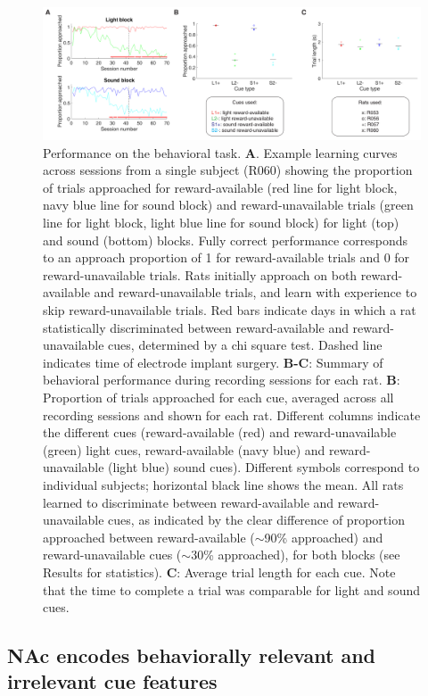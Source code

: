 \documentclass[11pt]{article}
\newcommand{\bsf}[1]{\textbf{#1}}
\begin{document}
 \begin{figure}[ht!]
\centering
\includegraphics[width=\textwidth]{Fig 3 - Behavioral results.pdf}
\caption{Performance on the behavioral task. \bsf{A}. Example learning
  curves across sessions from a single subject (R060) showing the
  proportion of trials approached for reward-available (red line for light
  block, navy blue line for sound block) and reward-unavailable trials
  (green line for light block, light blue line for sound block) for
  light (top) and sound (bottom) blocks. Fully correct performance
  corresponds to an approach proportion of 1 for reward-available
  trials and 0 for reward-unavailable trials. Rats initially approach
  on both reward-available and reward-unavailable trials, and learn
  with experience to skip reward-unavailable trials. Red bars indicate days
  in which a rat statistically discriminated between reward-available
  and reward-unavailable cues, determined by a chi square test. Dashed
  line indicates time of electrode implant surgery. \bsf{B-C}: Summary
  of behavioral performance during recording sessions for each rat. \bsf{B}:
  Proportion of trials approached for each cue, averaged across all recording
  sessions and shown for each rat. Different columns indicate the different cues
  (reward-available (red) and reward-unavailable (green) light cues,
  reward-available (navy blue) and reward-unavailable (light blue)
  sound cues). Different symbols correspond to individual subjects;
  horizontal black line shows the mean. All rats learned to
  discriminate between reward-available and reward-unavailable cues,
  as indicated by the clear difference of proportion approached
  between reward-available ($\sim$90\% approached) and
  reward-unavailable cues ($\sim$30\% approached), for both blocks
  (see Results for statistics). \bsf{C}: Average trial length for each
  cue. Note that the time to complete a trial was comparable for light and sound cues.}
\label{fig:behav}
\end{figure} \clearpage

\subsection*{NAc encodes behaviorally relevant and irrelevant cue features}
\end{document}
